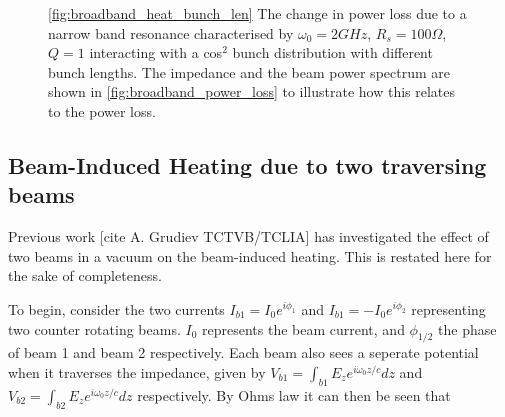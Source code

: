 \begin{figure}
\caption{\ref{fig:broadband_heat_bunch_len} The change in power loss due to a narrow band resonance characterised by $\omega_{0} = 2GHz$, $R_{s} = 100\Omega$, $Q = 1$ interacting with a cos$^{2}$ bunch distribution with different bunch lengths. The impedance and the beam power spectrum are shown in \ref{fig:broadband_power_loss} to illustrate how this relates to the power loss.}
\end{figure}

\subsection{Beam-Induced Heating due to two traversing beams}

Previous work [cite A. Grudiev TCTVB/TCLIA] has investigated the effect of two beams in a vacuum on the beam-induced heating. This is restated here for the sake of completeness.

To begin, consider the two currents $I_{b1} = I_{0}e^{i\phi_{1}}$ and $I_{b1} = -I_{0}e^{i\phi_{2}}$ representing two counter rotating beams. $I_{0}$ represents the beam current, and $\phi_{1/2}$ the phase of beam 1 and beam 2 respectively. Each beam also sees a seperate potential when it traverses the impedance, given by $V_{b1} = \int_{b1} E_{z} e^{i\omega_{0}z/c} dz$ and $V_{b2} = \int_{b2} E_{z} e^{i\omega_{0}z/c} dz$ respectively. By Ohms law it can then be seen that

